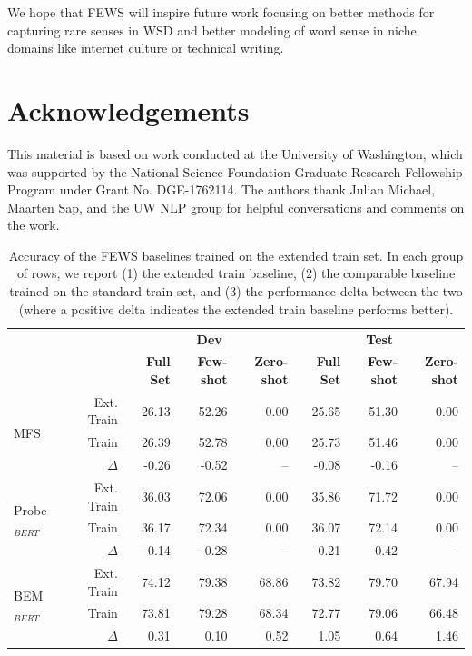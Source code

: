 \documentclass[11pt,a4paper]{article}
\begin{document}
We hope that FEWS will inspire future work focusing on better methods for capturing rare senses in WSD and better modeling of word sense in niche domains like internet culture or technical writing.  

\section*{Acknowledgements}
This material is based on work conducted at the University of Washington, which was supported by the National Science Foundation Graduate Research Fellowship Program under Grant No. DGE-1762114. The authors thank Julian Michael, Maarten Sap, and the UW NLP group for helpful conversations and comments on the work.





\begin{table}[t]
    \centering
    \begin{tabular}{l r| r r r | r r r} 
    \toprule
     & & \multicolumn{3}{c|}{\textbf{Dev}} & \multicolumn{3}{c}{\textbf{Test}} \\
     & & \textbf{Full Set}& \textbf{Few-shot} & \textbf{Zero-shot} & \textbf{Full Set} & \textbf{Few-shot} & \textbf{Zero-shot} \\
    \hline
    \hline
    \multirow{3}{*}{MFS} & Ext. Train & 26.13 & 52.26 & 0.00 & 25.65 & 51.30 & 0.00 \\
    & Train & 26.39 & 52.78 & 0.00 & 25.73 & 51.46 & 0.00 \\
    & $\Delta$ & -0.26 & -0.52 & -- & -0.08 & -0.16 & -- \\
    \hline
    \multirow{3}{*}{Probe$_{BERT}$} & Ext. Train & 36.03 & 72.06 & 0.00 & 35.86 & 71.72 & 0.00 \\
    & Train & 36.17 & 72.34 & 0.00 & 36.07 & 72.14 & 0.00 \\
    & $\Delta$ & -0.14 & -0.28 & -- & -0.21 & -0.42 & -- \\
    \hline
    \multirow{3}{*}{BEM$_{BERT}$} & Ext. Train & 74.12 & 79.38 & 68.86 & 73.82 & 79.70 & 67.94\\
    & Train & 73.81 & 79.28 & 68.34 & 72.77 & 79.06 & 66.48 \\
    & $\Delta$ & 0.31 & 0.10 & 0.52 & 1.05 & 0.64 & 1.46 \\
    \toprule
    \end{tabular}
    \caption{Accuracy of the FEWS baselines trained on the extended train set. In each group of rows, we report (1) the extended train baseline, (2) the comparable baseline trained on the standard train set, and (3) the performance delta between the two (where a positive delta indicates the extended train baseline performs better).}
    \label{extended-train-baselines}
\end{table}
\end{document}
